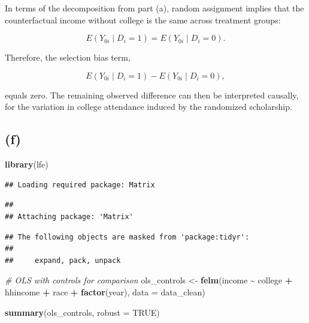 \documentclass[
]{article}
\newenvironment{Shaded}{\begin{snugshade}}{\end{snugshade}}
\newcommand{\AttributeTok}[1]{\textcolor[rgb]{0.13,0.29,0.53}{#1}}
\newcommand{\CommentTok}[1]{\textcolor[rgb]{0.56,0.35,0.01}{\textit{#1}}}
\newcommand{\ConstantTok}[1]{\textcolor[rgb]{0.56,0.35,0.01}{#1}}
\newcommand{\FunctionTok}[1]{\textcolor[rgb]{0.13,0.29,0.53}{\textbf{#1}}}
\newcommand{\NormalTok}[1]{#1}
\newcommand{\OtherTok}[1]{\textcolor[rgb]{0.56,0.35,0.01}{#1}}
\newcommand{\SpecialCharTok}[1]{\textcolor[rgb]{0.81,0.36,0.00}{\textbf{#1}}}
\begin{document}
In terms of the decomposition from part (a), random assignment implies
that the counterfactual income without college is the same across
treatment groups:

\[
E(Y_{0i} \mid D_i = 1) = E(Y_{0i} \mid D_i = 0).
\]

Therefore, the selection bias term,

\[
E(Y_{0i} \mid D_i = 1) - E(Y_{0i} \mid D_i = 0),
\]

equals zero. The remaining observed difference can then be interpreted
causally, for the variation in college attendance induced by the
randomized scholarship.

\subsection{(f)}\label{f}

\begin{Shaded}
\begin{Highlighting}[]
\FunctionTok{library}\NormalTok{(lfe)}
\end{Highlighting}
\end{Shaded}

\begin{verbatim}
## Loading required package: Matrix
\end{verbatim}

\begin{verbatim}
## 
## Attaching package: 'Matrix'
\end{verbatim}

\begin{verbatim}
## The following objects are masked from 'package:tidyr':
## 
##     expand, pack, unpack
\end{verbatim}

\begin{Shaded}
\begin{Highlighting}[]
\CommentTok{\# OLS with controls for comparison}
\NormalTok{ols\_controls }\OtherTok{\textless{}{-}} \FunctionTok{felm}\NormalTok{(income }\SpecialCharTok{\textasciitilde{}}\NormalTok{ college }\SpecialCharTok{+}\NormalTok{ hhincome }\SpecialCharTok{+}\NormalTok{ race }\SpecialCharTok{+} \FunctionTok{factor}\NormalTok{(year),}
                     \AttributeTok{data =}\NormalTok{ data\_clean)}

\FunctionTok{summary}\NormalTok{(ols\_controls, }\AttributeTok{robust =} \ConstantTok{TRUE}\NormalTok{)}
\end{Highlighting}
\end{Shaded}
\end{document}
